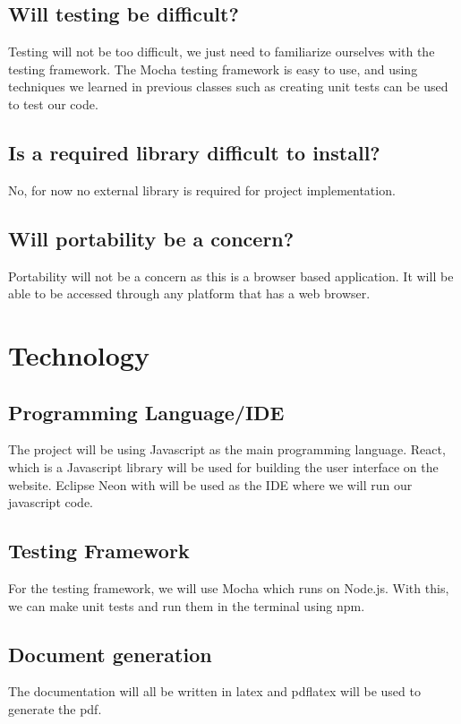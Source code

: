 \documentclass[12pt,fleqn]{article}
\begin{document}
\subsection*{Will testing be difficult?}
Testing will not be too difficult, we just need to familiarize ourselves with the testing framework. The Mocha testing framework is easy to use, and using techniques we learned in previous classes such as creating unit tests can be used to test our code.

\subsection*{Is a required library difficult to install?}
No, for now no external library is required for project implementation.

\subsection*{Will portability be a concern?}
Portability will not be a concern as this is a browser based application. It will be able to be accessed through any platform that has a web browser. 

\section *{Technology}

\subsection*{Programming Language/IDE}
The project will be using Javascript as the main programming language. React, which is a Javascript library will be used for building the user interface on the website. Eclipse Neon with will be used as the IDE where we will run our javascript code. 

\subsection*{Testing Framework}
For the testing framework, we will use Mocha which runs on Node.js. With this, we can make unit tests and run them in the terminal using npm. 

\subsection*{Document generation}
The documentation will all be written in latex and pdflatex will be used to generate the pdf.
\end{document}
